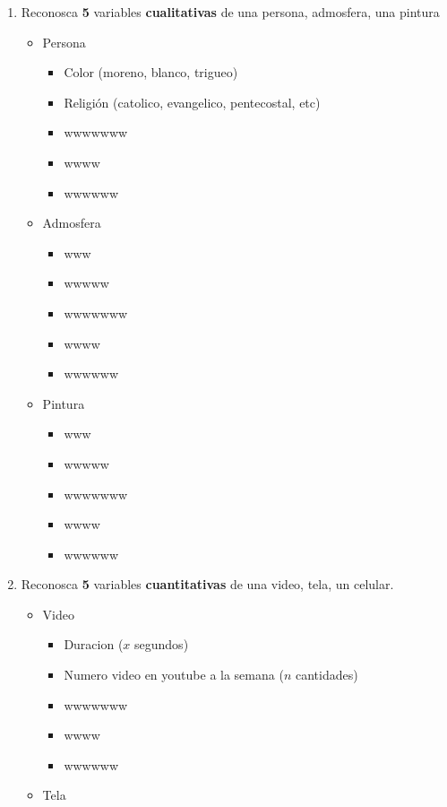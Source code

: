 \documentclass[10pt,]{krantz}
\providecommand{\tightlist}{%
  \setlength{\itemsep}{0pt}\setlength{\parskip}{0pt}}
\theoremstyle{definition}
\theoremstyle{definition}
\theoremstyle{definition}
\theoremstyle{definition}
\theoremstyle{remark}
\begin{document}
\begin{enumerate}
\def\labelenumi{\arabic{enumi}.}
\item
  Reconosca \textbf{5} variables \textbf{cualitativas} de una persona, admosfera, una pintura

  \begin{itemize}
  \tightlist
  \item
    Persona

    \begin{itemize}
    \tightlist
    \item
      Color (moreno, blanco, trigueo)
    \item
      Religión (catolico, evangelico, pentecostal, etc)
    \item
      wwwwwww
    \item
      wwww
    \item
      wwwwww
    \end{itemize}
  \item
    Admosfera

    \begin{itemize}
    \tightlist
    \item
      www
    \item
      wwwww
    \item
      wwwwwww
    \item
      wwww
    \item
      wwwwww
    \end{itemize}
  \item
    Pintura

    \begin{itemize}
    \tightlist
    \item
      www
    \item
      wwwww
    \item
      wwwwwww
    \item
      wwww
    \item
      wwwwww
    \end{itemize}
  \end{itemize}
\item
  Reconosca \textbf{5} variables \textbf{cuantitativas} de una video, tela, un celular.

  \begin{itemize}
  \tightlist
  \item
    Video

    \begin{itemize}
    \tightlist
    \item
      Duracion (\(x\) segundos)
    \item
      Numero video en youtube a la semana (\(n\) cantidades)
    \item
      wwwwwww
    \item
      wwww
    \item
      wwwwww
    \end{itemize}
  \item
    Tela


\end{itemize}
\end{enumerate}
\end{document}

